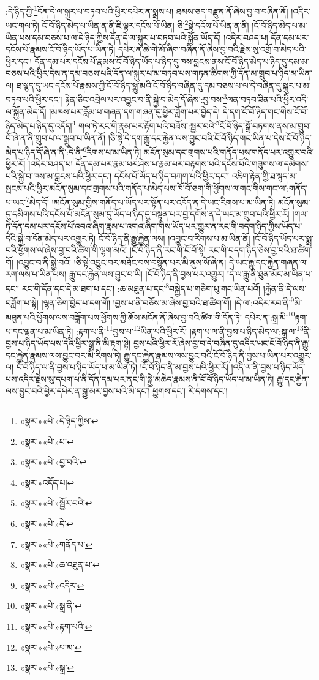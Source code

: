 :དེ་ཉིད་ཀྱི་\footnote{«སྣར་»«པེ་»དེ་ཉིད་ཀྱིས་}དོན་དེ་ལ་སྐུར་པ་བཏབ་པའི་ཕྱིར་དཔེར་ན་སྨྲས་པ། ཐམས་ཅད་བརྫུན་ནོ་ཞེས་བྱ་བ་བཞིན་ནོ། །འདིར་ཡང་གལ་ཏེ། ངོ་བོ་ཉིད་མེད་པ་ཡིན་ན་ནི་ཇི་ལྟར་དངོས་པོ་ཡིན། ཅི་\footnote{«སྣར་»«པེ་»པ་}སྟེ་དངོས་པོ་ཡིན་ན་ནི། །ངོ་བོ་ཉིད་མེད་པ་མ་ཡིན་པས་དམ་བཅས་པ་ལ་དེ་ཉིད་ཀྱིས་དོན་དེ་ལ་སྐུར་པ་བཏབ་པའི་སྐྱོན་ཡོད་དོ། །འདིར་བཤད་པ། དོན་དམ་པར་དངོས་པོ་རྣམས་ངོ་བོ་ཉིད་ཡོད་པ་ཡིན་ཏེ། དཔེར་ན་ཆེ་གེ་མོ་ཞིག་བཞིན་ནོ་ཞེས་བྱ་བའི་རྗེས་སུ་འགྲོ་བ་མེད་པའི་ཕྱིར་དང་། དོན་དམ་པར་དངོས་པོ་རྣམས་ངོ་བོ་ཉིད་ཡོད་པ་ཉིད་དུ་ཁས་བླངས་ནས་ངོ་བོ་ཉིད་མེད་པ་ཉིད་དུ་དམ་མ་བཅས་པའི་ཕྱིར་དེས་ན་དམ་བཅས་པའི་དོན་ལ་སྐུར་པ་མ་བཏབ་པས་གཏན་ཚིགས་ཀྱི་དོན་མ་གྲུབ་པ་ཉིད་མ་ཡིན་ལ། ཐ་སྙད་དུ་ཡང་དངོས་པོ་རྣམས་ཀྱི་ངོ་བོ་ཉིད་སྒྱུ་མའི་ངོ་བོ་ཉིད་བཞིན་དུ་དམ་བཅས་པ་ལ་དེ་བཞིན་དུ་སྐུར་པ་མ་བཏབ་པའི་ཕྱིར་དང་། རྟེན་ཅིང་འབྲེལ་པར་འབྱུང་བ་ནི་སྐྱེ་བ་མེད་དོ་ཞེས་:བྱ་བས་\footnote{«སྣར་»«པེ་»བྱ་བའི་}ལན་བཏབ་ཟིན་པའི་ཕྱིར་འདི་ལ་སྐྱོན་མེད་དོ། །མཁས་པར་རློམ་པ་གཞན་དག་གཞན་དུ་ཕྱིར་ཟློག་པར་བྱེད་དེ། དེ་དག་ངོ་བོ་ཉིད་གང་གིས་ངོ་བོ་ཉིད་མེད་པ་ཉིད་དུ་འདོད།\footnote{«སྣར་»འདོད་པ།} གལ་ཏེ་རང་གི་རྣམ་པར་རྟོག་པའི་བཟོས་:སྦྱར་བའི་\footnote{«སྣར་»«པེ་»སྦྱོར་བའི་}ངོ་བོ་ཉིད་སྒྲོ་བཏགས་ནས་མ་གྲུབ་བོ་ཞེ་ན་ནི་གྲུབ་པ་ལ་སྒྲུབ་པ་ཡིན་ནོ། །ཅི་སྟེ་དེ་དག་རྒྱུ་དང་རྐྱེན་ལས་བྱུང་བའི་ངོ་བོ་ཉིད་གང་ཡིན་པ་དེས་ངོ་བོ་ཉིད་མེད་པ་ཉིད་དོ་ཞེ་ན་ནི་:དེ་ནི་\footnote{«སྣར་»«པེ་»དེ་}རིགས་པ་མ་ཡིན་ཏེ། མངོན་སུམ་དང་གྲགས་པའི་གནོད་པས་གནོད་པར་འགྱུར་བའི་ཕྱིར་རོ། །འདིར་བཤད་པ། དོན་དམ་པར་རྣམ་པར་ཤེས་པ་རྣམ་པར་བརྟགས་པའི་དངོས་པོའི་གཟུགས་ལ་དམིགས་པའི་སྐྱེ་བ་ཁས་མ་བླངས་པའི་ཕྱིར་དང་། དངོས་པོ་ཡོད་པ་ཉིད་བཀག་པའི་ཕྱིར་དང་། འཇིག་རྟེན་གྱི་ཐ་སྙད་མ་སྤངས་པའི་ཕྱིར་མངོན་སུམ་དང་གྲགས་པའི་གནོད་པ་མེད་པས་ཁོ་བོ་ཅག་གི་ཕྱོགས་ལ་གང་གིས་གང་ལ་:གནོད་པ་ཡང་\footnote{«སྣར་»«པེ་»གནོད་པ་}མེད་དོ། །མངོན་སུམ་གྱིས་གནོད་པ་ཡོད་པར་སྟོན་པར་འདོད་ན་དེ་ཡང་རིགས་པ་མ་ཡིན་ཏེ། མངོན་སུམ་དུ་དམིགས་པའི་དངོས་པོ་མངོན་སུམ་དུ་ཡོད་པ་ཉིད་དུ་བསྟན་པར་བྱ་དགོས་ན་དེ་ཡང་མ་གྲུབ་པའི་ཕྱིར་རོ། །གལ་ཏེ་དོན་དམ་པར་དངོས་པོ་འབའ་ཞིག་རྣམ་པ་འགའ་ཞིག་གིས་ཡོད་པར་གྱུར་ན་རང་གི་བདག་ཉིད་ཀྱིས་ཡོད་པ་དེའི་སྐྱེ་བ་དོན་མེད་པར་འགྱུར་ཏེ། ངོ་བོ་ཉིད་ནི་རྒྱུ་རྐྱེན་ལས། །འབྱུང་བ་རིགས་པ་མ་ཡིན་ནོ། །ངོ་བོ་ཉིད་ཡོད་པར་སྨྲ་བའི་ཕྱོགས་ལ་ཞེས་བྱ་བའི་ཚིག་གི་ལྷག་མའོ། །ངོ་བོ་ཉིད་ནི་རང་གི་ངོ་བོ་སྟེ། རང་གི་བདག་ཉིད་ཅེས་བྱ་བའི་ཐ་ཚིག་གོ། །འབྱུང་བ་ནི་སྐྱེ་བའོ། །ཅི་སྟེ་འབྱུང་བར་མཐོང་བས་བསྙོན་པར་མི་ནུས་སོ་ཞེ་ན། དེ་ཡང་རྒྱུ་དང་རྐྱེན་གཞན་ལ་རག་ལས་པ་ཡིན་པས། རྒྱུ་དང་རྐྱེན་ལས་བྱུང་བ་ཡི། །ངོ་བོ་ཉིད་ནི་བྱས་པར་འགྱུར། །དེ་ལ་རྒྱུ་ནི་ཐུན་མོང་མ་ཡིན་པ་དང་། རང་གི་དོན་དང་དེ་མ་ཐག་པ་དང་། :ཆ་མཐུན་པ་དང་\footnote{«སྣར་»«པེ་»ཆ་འཐུན་པ་}བསྐྱེད་པ་གཅིག་པུ་གང་ཡིན་པའོ། །རྐྱེན་ནི་དེ་ལས་བཟློག་པ་སྟེ། །ལྷན་ཅིག་བྱེད་པ་དག་གོ། །བྱས་པ་ནི་བཅོས་མ་ཞེས་བྱ་བའི་ཐ་ཚིག་གོ། །དེ་ལ་:འདིར་རབ་ནི་\footnote{«སྣར་»«པེ་»འདིར་}མི་མཐུན་པའི་ཕྱོགས་ལས་བཟློག་པས་ཕྱོགས་ཀྱི་ཆོས་མངོན་ནོ་ཞེས་བྱ་བའི་ཚིག་གི་དོན་ཏེ། དཔེར་ན་:སྒྲ་མི་\footnote{«སྣར་»«པེ་»སྒྲ་ནི་}རྟག་པ་དང་ལྡན་པ་མ་ཡིན་ཏེ། :རྟག་པ་ནི་\footnote{«སྣར་»«པེ་»རྟག་པའི་}བྱས་པ་\footnote{«སྣར་»«པེ་»པ་མ་}ཡིན་པའི་ཕྱིར་རོ། །རྟག་པ་ལ་ནི་བྱས་པ་ཉིད་མེད་ལ་:སྒྲ་ལ་\footnote{«སྣར་»«པེ་»སྒྲ་}ནི་བྱས་པ་ཉིད་ཡོད་པས་དེའི་ཕྱིར་སྒྲ་ནི་མི་རྟག་སྟེ། བྱས་པའི་ཕྱིར་རོ་ཞེས་བྱ་བ་དེ་བཞིན་དུ་འདིར་ཡང་ངོ་བོ་ཉིད་ནི་རྒྱུ་དང་རྐྱེན་རྣམས་ལས་བྱུང་བར་མི་རིགས་ཏེ། རྒྱུ་དང་རྐྱེན་རྣམས་ལས་བྱུང་བའི་ངོ་བོ་ཉིད་ནི་བྱས་པ་ཡིན་པར་འགྱུར་ལ། ངོ་བོ་ཉིད་ལ་ནི་བྱས་པ་ཉིད་ཡོད་པ་མ་ཡིན་ཏེ། །ངོ་བོ་ཉིད་ནི་མ་བྱས་པའི་ཕྱིར་རོ། །འདི་ལ་ནི་བྱས་པ་ཉིད་ཡོད་པས་འདིར་རྗེས་སུ་དཔག་པ་ནི་དོན་དམ་པར་ནང་གི་སྐྱེ་མཆེད་རྣམས་ནི་ངོ་བོ་ཉིད་ཡོད་པ་མ་ཡིན་ཏེ། རྒྱུ་དང་རྐྱེན་ལས་བྱུང་བའི་ཕྱིར་དཔེར་ན་སྒྱུ་མར་བྱས་པའི་མི་དང་། ཕྱུགས་དང་། རི་དགས་དང་། 